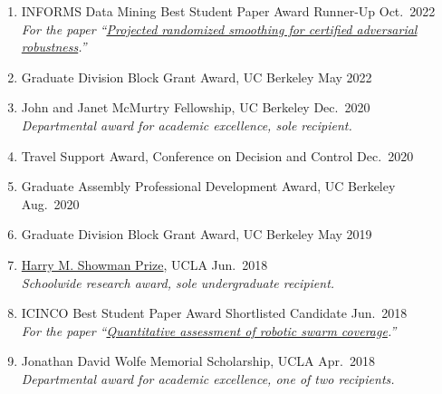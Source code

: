 \documentclass[11pt]{article}
\newcommand{\cvdate}[1]{\hfill#1}			%
\begin{document}
\begin{enumerate}[label={\arabic*.}]
		\item INFORMS Data Mining Best Student Paper Award Runner-Up
		\cvdate{Oct.\ 2022} \\
		\textit{For the paper ``\href{https://brendon-anderson.github.io/files/publications/pfrommer2023projected.pdf}{Projected randomized smoothing for certified adversarial robustness}.''}
		\item Graduate Division Block Grant Award, UC Berkeley
		\cvdate{May 2022}
		\item John and Janet McMurtry Fellowship, UC Berkeley
		\cvdate{Dec.\ 2020} \\
		\textit{Departmental award for academic excellence, sole recipient.}
		\item Travel Support Award, Conference on Decision and Control
		\cvdate{Dec.\ 2020}
		\item Graduate Assembly Professional Development Award, UC Berkeley
		\cvdate{Aug.\ 2020}
		\item Graduate Division Block Grant Award, UC Berkeley
		\cvdate{May 2019}
		\item \href{https://samueli.ucla.edu/2018-ucla-samueli-commencement-awards/}{Harry M. Showman Prize}, UCLA
		\cvdate{Jun.\ 2018} \\
		\textit{Schoolwide research award, sole undergraduate recipient.}
		\item ICINCO Best Student Paper Award Shortlisted Candidate
		\cvdate{Jun.\ 2018} \\
		\textit{For the paper ``\href{https://arxiv.org/pdf/1806.02488.pdf}{Quantitative assessment of robotic swarm coverage}.''}
		\item Jonathan David Wolfe Memorial Scholarship, UCLA
		\cvdate{Apr.\ 2018} \\
		\textit{Departmental award for academic excellence, one of two recipients.}
	\end{enumerate}
	
	\nocite{*}
	
	
\end{document}
